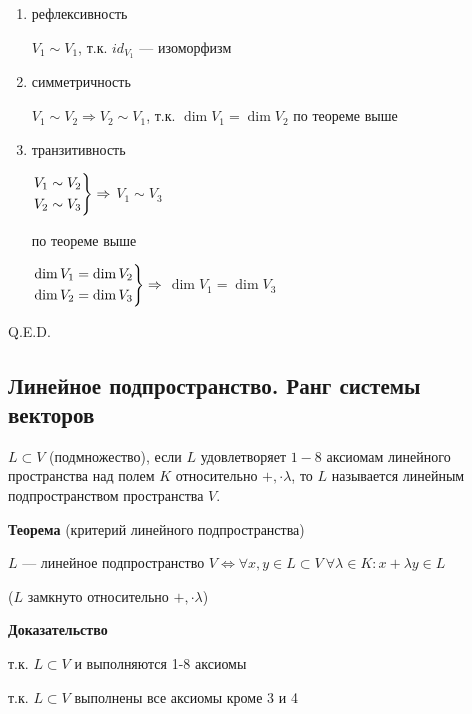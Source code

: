 \begin{enumerate}
    \item рефлексивность

          \(V_1 \sim V_1\), т.к. \(id_{V_1}\) --- изоморфизм

    \item симметричность

          \(V_1 \sim V_2 \Rightarrow V_2 \sim V_1\), т.к. \(\dim V_1 = \dim V_2\) по теореме выше

    \item транзитивность

          \(\begin{rcases*}
              V_1 \sim V_2 \\
              V_2 \sim V_3
          \end{rcases*} \Rightarrow\) \(V_1 \sim V_3\)

          по теореме выше

          \(\begin{rcases*}
              \dim V_1 = \dim V_2 \\
              \dim V_2 = \dim V_3
          \end{rcases*} \Rightarrow\) \(\dim V_1 = \dim V_3\)

\end{enumerate}
\hfill Q.E.D.

\newpage

\subsection{Линейное подпространство. Ранг системы векторов}

\(L \subset V\) (подмножество), если \(L\) удовлетворяет \(1-8\) аксиомам линейного пространства над полем \(K\) относительно \(+, \cdot \lambda\), то \(L\) называется линейным подпространством пространства \(V\).

\textbf{Теорема} (критерий линейного подпространства)

\(L\) --- линейное подпространство \(V \Leftrightarrow \forall x, y \in L \subset V \ \forall \lambda \in K: x + \lambda y \in L\)

(\(L\) замкнуто относительно \(+, \cdot \lambda\))

\textbf{Доказательство}

\fbox{\(\Rightarrow\)}
т.к. \(L \subset V\) и выполняются 1-8 аксиомы

\fbox{\(\Leftarrow\)}
т.к. \(L \subset V\) выполнены все аксиомы кроме 3 и 4

